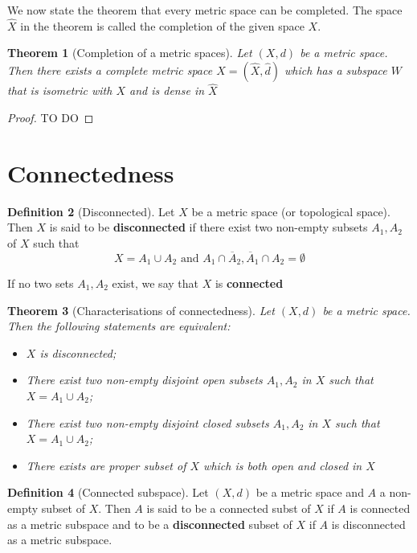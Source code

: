 \documentclass[10pt, oneside, reqno]{amsart}
\theoremstyle{plain}%
\newtheorem{thm}{Theorem}[section]
\theoremstyle{definition}
\newtheorem{defn}[thm]{Definition}
\theoremstyle{remark}
\newcommand{\met}{(X,d)}
\newcommand{\ol}[1]{\overline{#1}}
\begin{document}
We now state the theorem that every metric space can be completed. The space $\hat{X}$ in the theorem is called the completion of the given space $X$.

\begin{thm}[Completion of a metric spaces]
	Let $\met$ be a metric space.  Then there exists a complete metric space $\hat{X} = (\hat{X}, \hat{d})$ which has a subspace $W$ that is isometric with $X$ and is dense in $\hat{X}$
\end{thm}

\begin{proof}
	TO DO
\end{proof}

\section{Connectedness} %
\label{sec:connectedness}


\begin{defn}[Disconnected]
Let $X$ be a metric space (or topological space). Then $X$ is said to be \textbf{disconnected} if there exist two non-empty subsets $A_1, A_2$ of $X$ such that \[
	X= A_1 \cup A_2 \text{ and } A_1 \cap \ol A_2 , \ol A_1 \cap A_2 = \emptyset
\]

If no two sets $A_1, A_2$ exist, we say that $X$ is \textbf{connected}
\end{defn}

\begin{thm}[Characterisations of connectedness]
	Let $\met$ be a metric space. Then the following statements are equivalent:
	\begin{itemize}
		\item $X$ is disconnected;
		\item There exist two non-empty disjoint open subsets $A_1, A_2$ in $X$ such that $X = A_1 \cup A_2$;
		\item There exist two non-empty disjoint closed subsets $A_1, A_2$ in $X$ such that $X = A_1 \cup A_2$; 
		\item There exists are proper subset of $X$ which is both open and closed in $X$
	\end{itemize}
\end{thm}

\begin{defn}[Connected subspace]
	Let $\met$ be a metric space and $A$ a non-empty subset of $X$.  Then $A$ is said to be a connected subst of $X$ if $A$ is connected as a metric subspace and to be a \textbf{disconnected} subset of $X$ if $A$ is disconnected as a metric subspace.
\end{defn}
\end{document}
